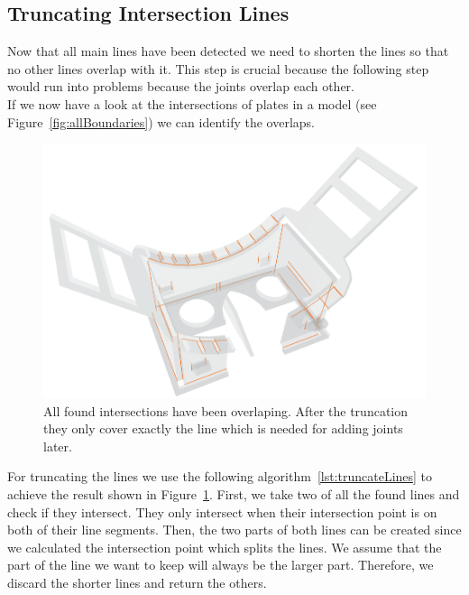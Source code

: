 \documentclass[../ClassicThesis.tex]{subfiles}
\begin{document}
\subsection{Truncating Intersection Lines}
Now that all main lines have been detected we need to shorten the lines so that no other lines overlap with it. This step is crucial because the following step  would run into problems because the joints overlap each other.\\
If we now have a look at the intersections of plates in a model (see Figure~\ref{fig:allBoundaries}) we can identify the overlaps.
\begin{figure}[!ht]
\centering
\includegraphics[width=\columnwidth]{Images/TruncatedIntersectionsHMD.png}
\caption{All found intersections have been overlaping. After the truncation they only cover exactly the line which is needed for adding joints later.}
\label{fig:innerBoundaries}
\end{figure}
For truncating the lines we use the following algorithm~\ref{lst:truncateLines} to achieve the result shown in Figure~\ref{fig:innerBoundaries}.
First, we take two of all the found lines and check if they intersect. They only intersect when their intersection point is on both of their line segments. Then, the two parts of both lines can be created since we calculated the intersection point which splits the lines. We assume that the part of the line we want to keep will always be the larger part. Therefore, we discard the shorter lines and return the others.
\end{document}
